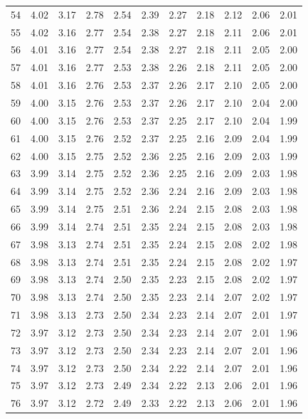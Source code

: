 \documentclass[
]{book}
\theoremstyle{definition}
\theoremstyle{definition}
\theoremstyle{definition}
\theoremstyle{definition}
\theoremstyle{remark}
\begin{document}
\begin{longtable}[]{@{}ccccccccccc@{}}
54 & 4.02 & 3.17 & 2.78 & 2.54 & 2.39 & 2.27 & 2.18 & 2.12 & 2.06 & 2.01 \\
55 & 4.02 & 3.16 & 2.77 & 2.54 & 2.38 & 2.27 & 2.18 & 2.11 & 2.06 & 2.01 \\
56 & 4.01 & 3.16 & 2.77 & 2.54 & 2.38 & 2.27 & 2.18 & 2.11 & 2.05 & 2.00 \\
57 & 4.01 & 3.16 & 2.77 & 2.53 & 2.38 & 2.26 & 2.18 & 2.11 & 2.05 & 2.00 \\
58 & 4.01 & 3.16 & 2.76 & 2.53 & 2.37 & 2.26 & 2.17 & 2.10 & 2.05 & 2.00 \\
59 & 4.00 & 3.15 & 2.76 & 2.53 & 2.37 & 2.26 & 2.17 & 2.10 & 2.04 & 2.00 \\
60 & 4.00 & 3.15 & 2.76 & 2.53 & 2.37 & 2.25 & 2.17 & 2.10 & 2.04 & 1.99 \\
61 & 4.00 & 3.15 & 2.76 & 2.52 & 2.37 & 2.25 & 2.16 & 2.09 & 2.04 & 1.99 \\
62 & 4.00 & 3.15 & 2.75 & 2.52 & 2.36 & 2.25 & 2.16 & 2.09 & 2.03 & 1.99 \\
63 & 3.99 & 3.14 & 2.75 & 2.52 & 2.36 & 2.25 & 2.16 & 2.09 & 2.03 & 1.98 \\
64 & 3.99 & 3.14 & 2.75 & 2.52 & 2.36 & 2.24 & 2.16 & 2.09 & 2.03 & 1.98 \\
65 & 3.99 & 3.14 & 2.75 & 2.51 & 2.36 & 2.24 & 2.15 & 2.08 & 2.03 & 1.98 \\
66 & 3.99 & 3.14 & 2.74 & 2.51 & 2.35 & 2.24 & 2.15 & 2.08 & 2.03 & 1.98 \\
67 & 3.98 & 3.13 & 2.74 & 2.51 & 2.35 & 2.24 & 2.15 & 2.08 & 2.02 & 1.98 \\
68 & 3.98 & 3.13 & 2.74 & 2.51 & 2.35 & 2.24 & 2.15 & 2.08 & 2.02 & 1.97 \\
69 & 3.98 & 3.13 & 2.74 & 2.50 & 2.35 & 2.23 & 2.15 & 2.08 & 2.02 & 1.97 \\
70 & 3.98 & 3.13 & 2.74 & 2.50 & 2.35 & 2.23 & 2.14 & 2.07 & 2.02 & 1.97 \\
71 & 3.98 & 3.13 & 2.73 & 2.50 & 2.34 & 2.23 & 2.14 & 2.07 & 2.01 & 1.97 \\
72 & 3.97 & 3.12 & 2.73 & 2.50 & 2.34 & 2.23 & 2.14 & 2.07 & 2.01 & 1.96 \\
73 & 3.97 & 3.12 & 2.73 & 2.50 & 2.34 & 2.23 & 2.14 & 2.07 & 2.01 & 1.96 \\
74 & 3.97 & 3.12 & 2.73 & 2.50 & 2.34 & 2.22 & 2.14 & 2.07 & 2.01 & 1.96 \\
75 & 3.97 & 3.12 & 2.73 & 2.49 & 2.34 & 2.22 & 2.13 & 2.06 & 2.01 & 1.96 \\
76 & 3.97 & 3.12 & 2.72 & 2.49 & 2.33 & 2.22 & 2.13 & 2.06 & 2.01 & 1.96 \\

\end{longtable}
\end{document}
